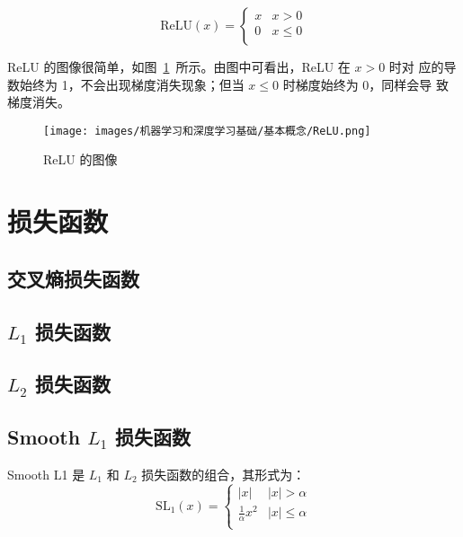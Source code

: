 \begin{equation}
  \label{equ:ReLU}
  \mathrm{ReLU}(x) = \left\{
    \begin{array}{lr}
      x & x > 0 \\
      0 & x \leq 0 \\
    \end{array}
  \right.
\end{equation}

ReLU 的图像很简单，如图~\ref{fig:ReLU}~所示。由图中可看出，ReLU 在 $x > 0$ 时对
应的导数始终为 1，不会出现梯度消失现象；但当 $x \leq 0$ 时梯度始终为 0，同样会导
致梯度消失。

\begin{figure}[ht]
  \centering
  \texttt{[image: images/机器学习和深度学习基础/基本概念/ReLU.png]}
  \caption{ReLU 的图像}
  \label{fig:ReLU}
\end{figure}

\section{损失函数}

\subsection{交叉熵损失函数}

\subsection{$L_1$ 损失函数}

\subsection{$L_2$ 损失函数}

\subsection{Smooth $L_1$ 损失函数}
Smooth L1 是 $L_1$ 和 $L_2$ 损失函数的组合，其形式为：
\begin{equation}
  \label{equ:SmoothL1}
  \mathrm{SL}_1(x) = \left\{
    \begin{array}{lr}
      |x| & |x| > \alpha \\
      \frac{1}{\alpha} x^2 & |x| \leq \alpha \\
    \end{array}
  \right.
\end{equation}

